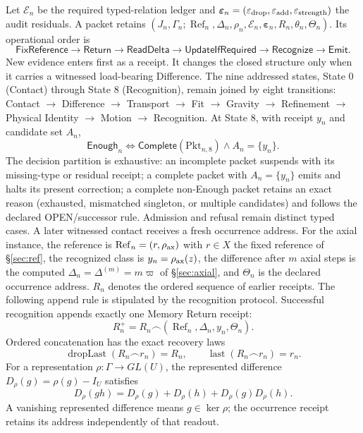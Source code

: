 \documentclass[10pt]{article}
\begin{document}
Let $\mathcal E_n$ be the required typed-relation ledger and $\boldsymbol\varepsilon_n=(\varepsilon_{\rm drop},\varepsilon_{\rm add},\varepsilon_{\rm strength})$ the audit residuals. A packet retains $(J_n,\Gamma_n;\operatorname{Ref}_n,\Delta_n,\rho_n,\mathcal E_n,\boldsymbol\varepsilon_n,R_n,\theta_n,\Theta_n)$. Its operational order is
\begin{equation}
\boxed{\mathsf{FixReference}\to\mathsf{Return}
\to\mathsf{ReadDelta}\to\mathsf{UpdateIfRequired}
\to\mathsf{Recognize}\to\mathsf{Emit}.}
\end{equation}
New evidence enters first as a receipt. It changes the closed structure only when it carries a witnessed load-bearing Difference. The nine addressed states, State 0 (Contact) through State 8 (Recognition), remain joined by eight transitions: Contact $\to$ Difference $\to$ Transport $\to$ Fit $\to$ Gravity $\to$ Refinement $\to$ Physical Identity $\to$ Motion $\to$ Recognition. At State 8, with receipt $y_n$ and candidate set $A_n$,
\begin{equation}\boxed{\mathsf{Enough}_n\iff\mathsf{Complete}(\mathrm{Pkt}_{n,8})\land A_n=\{y_n\}.}\label{eq:enough}\end{equation}
The decision partition is exhaustive: an incomplete packet suspends with its missing-type or residual receipt; a complete packet with $A_n=\{y_n\}$ emits and halts its present correction; a complete non-Enough packet retains an exact reason (exhausted, mismatched singleton, or multiple candidates) and follows the declared OPEN/successor rule. Admission and refusal remain distinct typed cases. A later witnessed contact receives a fresh occurrence address. For the axial instance, the reference is
$\operatorname{Ref}_n=(r,\rho_{\rm ax})$ with $r\in X$ the fixed reference of \S\ref{sec:ref}, the recognized class is
$y_n=\rho_{\rm ax}(z)$, the difference after $m$ axial steps is the computed
$\Delta_n=\Delta^{(m)}=m\varpi$ of \S\ref{sec:axial}, and $\Theta_n$ is the declared occurrence address.
$R_n$ denotes the ordered sequence of earlier receipts.
The following append rule is stipulated by the recognition protocol.
Successful recognition appends exactly one Memory Return receipt:
\begin{equation}\boxed{R_n^+=R_n\frown(\operatorname{Ref}_n,\Delta_n,y_n,\Theta_n).}\label{eq:receipt}\end{equation}
Ordered concatenation has the exact recovery laws
\begin{equation}
\boxed{\operatorname{dropLast}(R_n\frown r_n)=R_n,\qquad
\operatorname{last}(R_n\frown r_n)=r_n.}
\end{equation}
For a representation $\rho:\Gamma\to GL(U)$, the represented difference
$D_\rho(g)=\rho(g)-I_U$ satisfies
\begin{equation}
\boxed{D_\rho(gh)=D_\rho(g)+D_\rho(h)+D_\rho(g)D_\rho(h).}
\end{equation}
A vanishing represented difference means $g\in\ker\rho$; the occurrence receipt retains its address independently of that readout.
\end{document}
